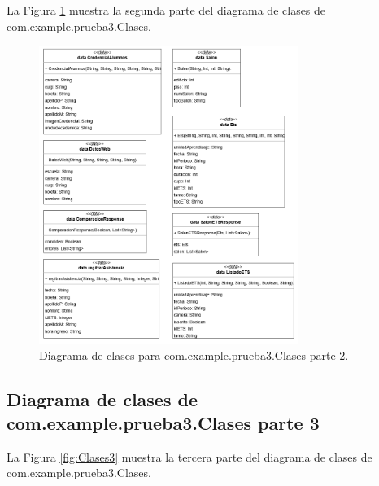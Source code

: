 La Figura \ref{fig:Clases2} muestra la segunda parte del diagrama de clases de com.example.prueba3.Clases.

\begin{figure}[htbp!]
	\begin{center}
		\includegraphics[width=0.75\textwidth]{DiagramasMoviles/DCM (3)}
		\caption{Diagrama de clases para com.example.prueba3.Clases parte 2.}
		\label{fig:Clases2}
	\end{center}
\end{figure}

\newpage

\subsection{Diagrama de clases de com.example.prueba3.Clases parte 3}

La Figura \ref{fig:Clases3} muestra la tercera parte del diagrama de clases de com.example.prueba3.Clases.

